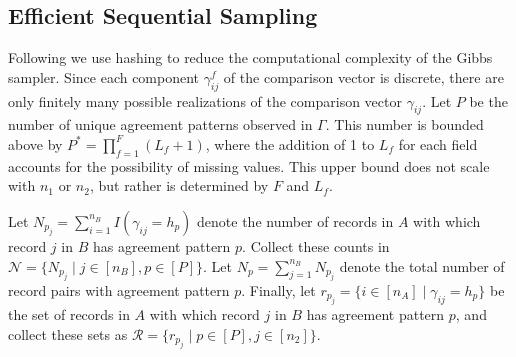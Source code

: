 \documentclass[12pt,letterpaper]{article}
\newcommand{\1}[1]{\mathbb{I}\!\left[#1\right]} %
\begin{document}
\subsection{Efficient Sequential Sampling}\label{sec:efficient-sampling}

Following \cite{kundinger_2023} we use hashing to reduce the computational complexity of the Gibbs sampler. Since each component $\gamma_{ij}^f$ of the comparison vector is discrete, there are only finitely many possible realizations of the comparison vector $\gamma_{ij}$. Let $P$ be the number of unique agreement patterns observed in $\Gamma$. This number is bounded above by $P^{*} = \prod_{f=1}^F (L_f + 1)$, where the addition of 1 to $L_f$ for each field accounts for the possibility of missing values. This upper bound does not scale with $n_1$ or $n_2$, but rather is determined by $F$ and $L_f$. 

Let $N_{p_j}=\sum_{i=1}^{n_B}I(\gamma_{ij}=h_p)$ denote the number of records in $A$ with which record $j$ in $B$ has agreement pattern $p$. Collect these counts in $\mathcal{N}=\{N_{p_j}\mid j\in[n_B], p\in[P]\}.$ Let $N_p=\sum_{j=1}^{n_B}N_{p_j}$ denote the total number of record pairs with agreement pattern $p$. Finally, let $r_{p_j}=\{i\in[n_A]\mid \gamma_{ij}=h_p\}$ be the set of records in $A$ with which record $j$ in $B$ has agreement pattern $p$, and collect these sets as $\mathcal{R}=\{r_{p_j}\mid p\in[P], j\in[n_2]\}$.
\end{document}
